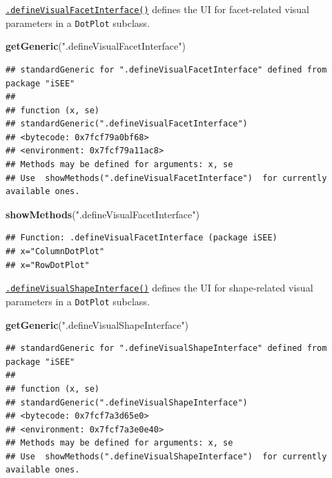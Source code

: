 \documentclass[
]{book}
\newenvironment{Shaded}{\begin{snugshade}}{\end{snugshade}}
\newcommand{\KeywordTok}[1]{\textcolor[rgb]{0.13,0.29,0.53}{\textbf{#1}}}
\newcommand{\NormalTok}[1]{#1}
\newcommand{\StringTok}[1]{\textcolor[rgb]{0.31,0.60,0.02}{#1}}
\begin{document}
\href{https://isee.github.io/iSEE/reference/visual-parameters-generics.html}{\texttt{.defineVisualFacetInterface()}} defines the UI for facet-related visual parameters in a \texttt{DotPlot} subclass.

\begin{Shaded}
\begin{Highlighting}[]
\KeywordTok{getGeneric}\NormalTok{(}\StringTok{".defineVisualFacetInterface"}\NormalTok{)}
\end{Highlighting}
\end{Shaded}

\begin{verbatim}
## standardGeneric for ".defineVisualFacetInterface" defined from package "iSEE"
## 
## function (x, se) 
## standardGeneric(".defineVisualFacetInterface")
## <bytecode: 0x7fcf79a0bf68>
## <environment: 0x7fcf79a11ac8>
## Methods may be defined for arguments: x, se
## Use  showMethods(".defineVisualFacetInterface")  for currently available ones.
\end{verbatim}

\begin{Shaded}
\begin{Highlighting}[]
\KeywordTok{showMethods}\NormalTok{(}\StringTok{".defineVisualFacetInterface"}\NormalTok{)}
\end{Highlighting}
\end{Shaded}

\begin{verbatim}
## Function: .defineVisualFacetInterface (package iSEE)
## x="ColumnDotPlot"
## x="RowDotPlot"
\end{verbatim}

\href{https://isee.github.io/iSEE/reference/visual-parameters-generics.html}{\texttt{.defineVisualShapeInterface()}} defines the UI for shape-related visual parameters in a \texttt{DotPlot} subclass.

\begin{Shaded}
\begin{Highlighting}[]
\KeywordTok{getGeneric}\NormalTok{(}\StringTok{".defineVisualShapeInterface"}\NormalTok{)}
\end{Highlighting}
\end{Shaded}

\begin{verbatim}
## standardGeneric for ".defineVisualShapeInterface" defined from package "iSEE"
## 
## function (x, se) 
## standardGeneric(".defineVisualShapeInterface")
## <bytecode: 0x7fcf7a3d65e0>
## <environment: 0x7fcf7a3e0e40>
## Methods may be defined for arguments: x, se
## Use  showMethods(".defineVisualShapeInterface")  for currently available ones.
\end{verbatim}
\end{document}
